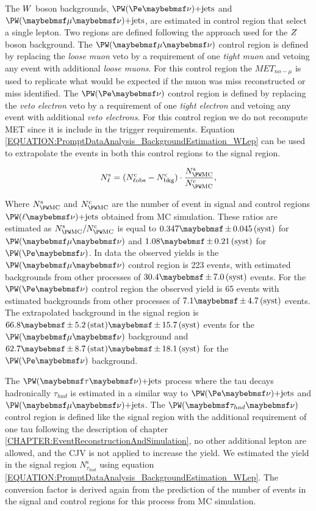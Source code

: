The $W$ boson backgrounds, $\PW (\Pe \nu)\text{+jets}$ and $\PW (\mu \nu)\text{+jets}$, are estimated in control region that select a single lepton. Two regions are defined following the approach used for the $Z$ boson background. The $\PW (\mu \nu)$ control region is defined by replacing the \textit{loose muon} veto by a requirement of one \textit{tight muon} and vetoing any event with additional \textit{loose muons}. For this control region the $MET_{no-\mu}$ is used to replicate what would be expected if the muon was miss reconstructed or miss identified. The $\PW (\Pe \nu)$ control region is defined by replacing the \textit{veto electron} veto by a requirement of one \textit{tight electron} and vetoing any event with additional \textit{veto electrons}. For this control region we do not recompute \gls{MET} since it is include in the trigger requirements. Equation \ref{EQUATION:PromptDataAnalysis_BackgroundEstimation_WLep} can be used to extrapolate the events in both this control regions to the signal region.

\begin{equation}
N^\mathrm{s}_\ell = (N^\mathrm{c}_{\ell\text{obs}} - N^\mathrm{c}_\text{bkg}) \cdot \frac{N^\mathrm{s}_{\PW \mathrm{MC}}}{N^\mathrm{c}_{\PW \mathrm{MC}}},
\label{EQUATION:PromptDataAnalysis_BackgroundEstimation_WLep}
\end{equation}

Where $N^\mathrm{s}_{\PW \mathrm{MC}}$ and $N^\mathrm{c}_{\PW \mathrm{MC}}$  are the number of event in signal and control regions $\PW (\ell \nu)\text{+jets}$ obtained from \gls{MC} simulation. These ratios are estimated as $N^\mathrm{s}_{\PW \mathrm{MC}}/N^\mathrm{c}_{\PW \mathrm{MC}}$ is equal to $0.347 \pm 0.045\syst$ for $\PW (\mu \nu)$ and $1.08 \pm 0.21\syst$ for $\PW (\Pe \nu)$. In data the observed yields is the $\PW (\mu \nu)$ control region is 223 events, with estimated backgrounds from other processes of $30.4 \pm 7.0\syst$ events. For the $\PW (\Pe \nu)$ control region the observed yield is 65 events with estimated backgrounds from other processes of $7.1 \pm 4.7\syst$ events. The  extrapolated background in the signal region is $66.8 \pm 5.2\stat \pm 15.7\syst$ events for the $\PW (\mu \nu)$ background and  $62.7 \pm 8.7\stat \pm 18.1\syst$ for the $\PW (\Pe \nu)$ background.

The $\PW (\tau \nu)\text{+jets}$ process where the tau decays hadronically $\tau_{had}$ is estimated in a similar way to $\PW (\Pe \nu)\text{+jets}$ and $\PW (\mu \nu)\text{+jets}$. The $\PW (\tau_{had} \nu)$ control region is defined like the signal region with the additional requirement of one tau following the description of chapter \ref{CHAPTER:EventReconstructionAndSimulation}, no other additional lepton are allowed, and the \gls{CJV} is not applied to increase the yield. We estimated the yield in the signal region $N^\mathrm{s}_{\tau_{had}}$ using equation \ref{EQUATION:PromptDataAnalysis_BackgroundEstimation_WLep}. The conversion factor is derived again from the prediction of the number of events in the signal and control regions for this process from \gls{MC} simulation. 
 
